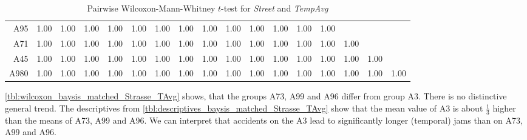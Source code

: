 \begin{table}[ht]
\begin{tabular}{rrrrrrrrrrrrrrrrr}
		A95 	& 1.00 & 1.00 & 1.00 & 1.00 & 1.00 & 1.00 & 1.00 & 1.00 & 1.00 & 1.00 & 1.00 & 1.00 & 1.00 &  &  &  \\ 
		A71		& 1.00 & 1.00 & 1.00 & 1.00 & 1.00 & 1.00 & 1.00 & 1.00 & 1.00 & 1.00 & 1.00 & 1.00 & 1.00 & 1.00 &  &  \\ 
		A45 	& 1.00 & 1.00 & 1.00 & 1.00 & 1.00 & 1.00 & 1.00 & 1.00 & 1.00 & 1.00 & 1.00 & 1.00 & 1.00 & 1.00 & 1.00 &  \\ 
		A980 	& 1.00 & 1.00 & 1.00 & 1.00 & 1.00 & 1.00 & 1.00 & 1.00 & 1.00 & 1.00 & 1.00 & 1.00 & 1.00 & 1.00 & 1.00 & 1.00 \\
		\bottomrule
	\end{tabular}
	\caption{Pairwise Wilcoxon-Mann-Whitney $t$-test for \textit{Street} and \textit{TempAvg}}
	\label{tbl:wilcoxon_baysis_matched_Strasse_TAvg}
\end{table}
\autoref{tbl:wilcoxon_baysis_matched_Strasse_TAvg} shows, that the groups A73, A99 and A96 differ from group A3. There is no distinctive general trend. The descriptives from \autoref{tbl:descriptives_baysis_matched_Strasse_TAvg} show that the mean value of A3 is about $\frac{1}{3}$ higher than the means of A73, A99 and A96. We can interpret that accidents on the A3 lead to significantly longer (temporal) jams than on A73, A99 and A96.
